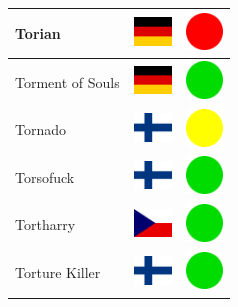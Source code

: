 \documentclass[12pt, a4paper, twoside]{report}
\begin{document}
\begin{center}
\begin{longtable}{|p{5cm}|p{2cm}|p{2cm}|}
Torian & \includegraphics[width=1cm]{4x3/de} & \includegraphics[width=1cm]{likes/n} \\ \hline
Torment of Souls & \includegraphics[width=1cm]{4x3/de} & \includegraphics[width=1cm]{likes/y} \\ \hline
Tornado & \includegraphics[width=1cm]{4x3/fi} & \includegraphics[width=1cm]{likes/m} \\ \hline
Torsofuck & \includegraphics[width=1cm]{4x3/fi} & \includegraphics[width=1cm]{likes/y} \\ \hline
Tortharry & \includegraphics[width=1cm]{4x3/cz} & \includegraphics[width=1cm]{likes/y} \\ \hline
Torture Killer & \includegraphics[width=1cm]{4x3/fi} & \includegraphics[width=1cm]{likes/y} \\ \hline

\end{longtable}
\end{center}
\end{document}
